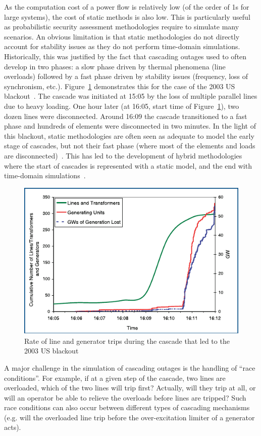 As the computation cost of a power flow is relatively low (of the order of 1s for large systems), the cost of static methods is also low. This is particularly useful as probabilistic security assessment methodologies require to simulate many scenarios. An obvious limitation is that static methodologies do not directly account for stability issues as they do not perform time-domain simulations. Historically, this was justified by the fact that cascading outages used to often develop in two phases: a slow phase driven by thermal phenomena (line overloads) followed by a fast phase driven by stability issues (frequency, loss of synchronism, etc.). Figure~\ref{fig:BlackoutUS2003} demonstrates this for the case of the 2003 US blackout~\cite{USBlackout2003}. The cascade was initiated at 15:05 by the loss of multiple parallel lines due to heavy loading. One hour later (at 16:05, start time of Figure~\ref{fig:BlackoutUS2003}), two dozen lines were disconnected. Around 16:09 the cascade transitioned to a fast phase and hundreds of elements were disconnected in two minutes. In the light of this blackout, static methodologies are often seen as adequate to model the early stage of cascades, but not their fast phase (where most of the elements and loads are disconnected)~\cite{BenchmarkingStaticVsDynamic}. This has led to the development of hybrid methodologies where the start of cascades is represented with a static model, and the end with time-domain simulations~\cite{TwoLevelPSA, DCATphase1}.

\begin{figure}
    \centering
    \includegraphics[width=0.7\linewidth]{Figs/USBlackout2003.pdf}
    \caption{Rate of line and generator trips during the cascade that led to the 2003 US blackout~\cite{StabilityDefinitionRevised}}
    \label{fig:BlackoutUS2003}
\end{figure}

A major challenge in the simulation of cascading outages is the handling of ``race conditions''. For example, if at a given step of the cascade, two lines are overloaded, which of the two lines will trip first? Actually, will they trip at all, or will an operator be able to relieve the overloads before lines are tripped? Such race conditions can also occur between different types of cascading mechanisms (e.g. will the overloaded line trip before the over-excitation limiter of a generator acts).


